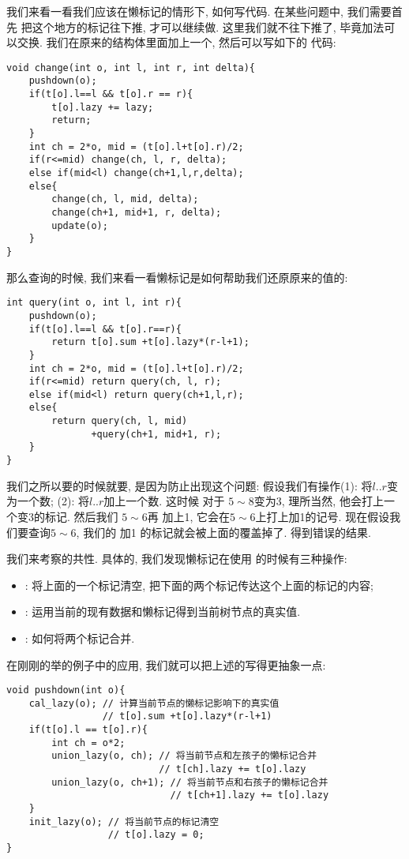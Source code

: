 我们来看一看我们应该在懒标记的情形下, 如何写代码. 在某些问题中, 我们需要首先
把这个地方的标记往下推, 才可以继续做. 这里我们就不往下推了, 毕竟加法可以交换.
我们在原来的结构体里面加上一个, 然后可以写如下的
代码: 
\begin{lstlisting}
void change(int o, int l, int r, int delta){
    pushdown(o);
    if(t[o].l==l && t[o].r == r){
        t[o].lazy += lazy;
        return;
    }
    int ch = 2*o, mid = (t[o].l+t[o].r)/2;
    if(r<=mid) change(ch, l, r, delta);
    else if(mid<l) change(ch+1,l,r,delta);
    else{
        change(ch, l, mid, delta);
        change(ch+1, mid+1, r, delta);
        update(o);
    }
}
\end{lstlisting}

那么查询的时候, 我们来看一看懒标记是如何帮助我们还原原来的值的: 

\begin{lstlisting}
int query(int o, int l, int r){
    pushdown(o);
    if(t[o].l==l && t[o].r==r){
        return t[o].sum +t[o].lazy*(r-l+1);
    }
    int ch = 2*o, mid = (t[o].l+t[o].r)/2;
    if(r<=mid) return query(ch, l, r);
    else if(mid<l) return query(ch+1,l,r);
    else{
        return query(ch, l, mid)
               +query(ch+1, mid+1, r);
    }
}
\end{lstlisting}

我们之所以要的时候就要, 是因为防止出现这个问题: 
假设我们有操作(1): 将$l..r$变为一个数; (2): 将$l..r$加上一个数. 这时候 
对于 $5\sim 8$变为3, 理所当然, 他会打上一个变3的标记. 然后我们 $5\sim 6$再
加上1, 它会在$5\sim 6$上打上加1的记号. 现在假设我们要查询$5\sim 6$, 我们的 
加1 的标记就会被上面的覆盖掉了. 得到错误的结果. 

我们来考察的共性. 具体的, 我们发现懒标记在使用
的时候有三种操作: 
\begin{itemize}[noitemsep]
    \item {}: 将上面的一个标记清空, 把下面的两个标记传达这个上面的标记的内容;
    \item {}: 运用当前的现有数据和懒标记得到当前树节点的真实值. 
    \item {}: 如何将两个标记合并. 
\end{itemize}

在刚刚的举的例子中的应用, 我们就可以把上述的写得更抽象一点: 
\begin{lstlisting}
void pushdown(int o){
    cal_lazy(o); // 计算当前节点的懒标记影响下的真实值
                 // t[o].sum +t[o].lazy*(r-l+1)
    if(t[o].l == t[o].r){
        int ch = o*2;
        union_lazy(o, ch); // 将当前节点和左孩子的懒标记合并
                           // t[ch].lazy += t[o].lazy
        union_lazy(o, ch+1); // 将当前节点和右孩子的懒标记合并
                             // t[ch+1].lazy += t[o].lazy
    }
    init_lazy(o); // 将当前节点的标记清空
                  // t[o].lazy = 0; 
}
\end{lstlisting}

